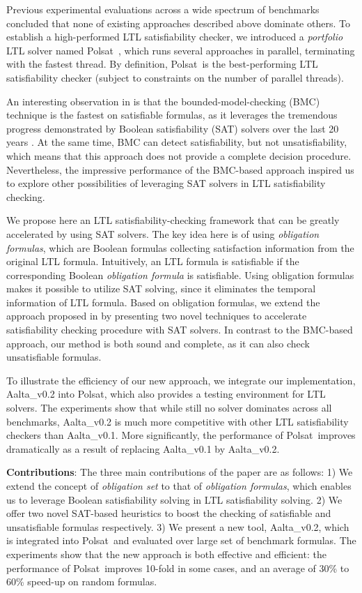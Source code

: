 \documentclass[conference]{IEEEtran}
\def\Polsat{{Polsat}}
\def\Aalta{{Aalta}}
\begin{document}
Previous experimental evaluations across a wide spectrum of benchmarks 
\cite{RV10,RV11,SD11} concluded that none of existing approaches
described above dominate others. To establish a high-performed LTL 
satisfiability checker, we introduced a \emph{portfolio} LTL solver named 
\Polsat\ \cite{LPZVHCoRR13}, which runs several approaches in parallel,
terminating with the fastest thread. By definition, \Polsat\ is the
best-performing LTL satisfiability checker (subject to
constraints on the number of parallel threads).

An interesting observation in \cite{LPZVHCoRR13} is that the 
bounded-model-checking (BMC) technique \cite{CBRZ01} is the fastest 
on satisfiable formulas, as it leverages the tremendous progress 
demonstrated by Boolean satisfiability (SAT) solvers over the last 20 years 
\cite{MZ09}.  At the same time, BMC can detect satisfiability, but not 
unsatisfiability, which means that this approach does not provide a 
complete decision procedure. Nevertheless, the impressive performance of the
BMC-based approach inspired us to explore other possibilities of leveraging 
SAT solvers in LTL satisfiability checking.

We propose here an LTL satisfiability-checking framework that can be greatly
accelerated by using SAT solvers. The key idea here is of using
\emph{obligation formulas}, which are Boolean formulas
collecting satisfaction information from the original LTL
formula.  Intuitively, an LTL formula is satisfiable if the
corresponding Boolean \emph{obligation formula} is satisfiable. 
Using obligation formulas makes it possible to utilize SAT solving, 
since it eliminates the temporal information of LTL formula. Based on
obligation formulas, we extend the approach proposed in \cite{LZPVH13}
by presenting two novel techniques to accelerate satisfiability
checking procedure with SAT solvers.  In contrast to the BMC-based approach,
our method is both sound and complete, as it can also check unsatisfiable 
formulas.

To illustrate the efficiency of our new approach, we integrate our
implementation, \Aalta\_v0.2 into \Polsat, which also provides a
testing environment for LTL solvers.  The experiments show that 
while still no solver dominates across all benchmarks,  \Aalta\_v0.2
is much more competitive with other LTL satisfiability checkers than
\Aalta\_v0.1. More significantly, the performance of \Polsat\ improves dramatically 
as a result of replacing  \Aalta\_v0.1 by  \Aalta\_v0.2.

\noindent
\textbf{Contributions}: The three main contributions of the paper are as 
follows: 1) We extend the concept of \emph{obligation set} to that of
\textit{obligation formulas}, which enables us to leverage Boolean
satisfiability solving in LTL satisfiability solving.
2) We offer two novel SAT-based heuristics to boost the checking of 
satisfiable and unsatisfiable formulas respectively. 
3) We present a new tool, \Aalta\_v0.2, which is integrated into \Polsat\ 
and evaluated over large set of benchmark formulas. The experiments show 
that the new approach is both effective and efficient: the performance of
\Polsat\ improves 10-fold in some cases, and an average of 30\% to 60\% 
speed-up on random formulas.
\end{document}
